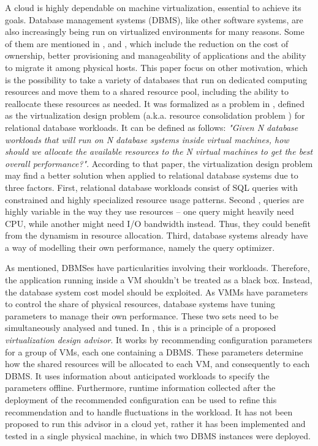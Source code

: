 A cloud is highly dependable on machine virtualization, essential to achieve its goals. Database management systems (DBMS), like other software systems, are also increasingly being run on virtualized environments for many reasons. Some of them are mentioned in \cite{4498282}, \cite{4401021} and \cite{Soror:2008:AVM:1376616.1376711}, which include the reduction on the cost of ownership, better provisioning and manageability of applications and the ability to migrate it among physical hosts. This paper focus on other motivation, which is the possibility to take a variety of databases that run on dedicated computing resources and move them to a shared resource pool, including the ability to reallocate these resources as needed. It was formalized as a problem in \cite{4401021}, defined as the virtualization design problem (a.k.a. resource consolidation problem ) for relational database workloads. It can be defined as follows: \textit{"Given N database workloads that will run on N database systems inside virtual machines, how should we allocate the available resources to the N virtual machines to get the best overall performance?"}. According to that paper, the virtualization design problem may find a better solution when applied to relational database systems due to three factors. First, relational database workloads consist of SQL queries with constrained and highly specialized resource usage patterns. Second , queries are highly variable in the way they use resources -- one query might heavily need CPU, while another might need I/O bandwidth instead. Thus, they could benefit from the dynamism in resource allocation. Third, database systems already have a way of modelling their own performance, namely the query optimizer.

As mentioned, DBMSes have particularities involving their workloads. Therefore, the application running inside a VM shouldn't be treated as a black box. Instead, the database system cost model should be exploited. As VMMs have parameters to control the share of physical resources, database systems have tuning parameters to manage their own performance. These two sets need to be simultaneously analysed and tuned. In \cite{Soror:2008:AVM:1376616.1376711}, this is a principle of a proposed \textit{virtualization design advisor}. It works by recommending configuration parameters for a group of VMs, each one containing a DBMS. These parameters determine how the shared resources will be allocated to each VM, and consequently to each DBMS. It uses information about anticipated workloads to specify the parameters offline. Furthermore, runtime information collected after the deployment of the recommended configuration can be used to refine this recommendation and to handle fluctuations in the workload. It has not been proposed to run this advisor in a cloud yet, rather it has been implemented and tested in a single physical machine, in which two DBMS instances were deployed.


